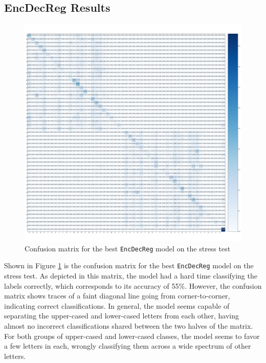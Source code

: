 \newpage
\subsection{EncDecReg Results}
\begin{figure}[ht]
    \centering
    \includegraphics[width=1\textwidth]{fig/results/experiment4/encdecreg/confusion_matrix.png}
    \caption{Confusion matrix for the best {\tt EncDecReg} model on the stress test}
    \label{fig:result4_encdecreg_confusion_matrix}
\end{figure}

Shown in Figure \ref{fig:result4_encdecreg_confusion_matrix} is the confusion matrix for the best {\tt EncDecReg} model on the stress test. As depicted in this matrix, the model had a hard time classifying the labels correctly, which corresponds to its accuracy of 55\%. However, the confusion matrix shows traces of a faint diagonal line going from corner-to-corner, indicating correct classifications. In general, the model seems capable of separating the upper-cased and lower-cased letters from each other, having almost no incorrect classifications shared between the two halves of the matrix. For both groups of upper-cased and lower-cased classes, the model seems to favor a few letters in each, wrongly classifying them across a wide spectrum of other letters.

